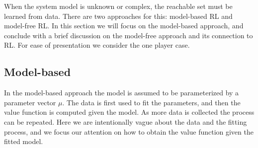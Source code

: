 
When the system model is unknown or complex, the reachable set must be learned from data. There are two approaches for this: model-based RL and model-free RL. In this section we will focus on the model-based approach, and conclude with a brief discussion on the model-free approach and its connection to RL. For ease of presentation we consider the one player case.

\subsection{Model-based} \label{sec:model_based}

In the model-based approach the model is assumed to be parameterized by a parameter vector $\mu$. %
%
The data is first used to fit the parameters, and then the value function is computed given the model. As more data is collected the process can be repeated. Here we are intentionally vague about the data and the fitting process, and we focus our attention on how to obtain the value function given the fitted model.

